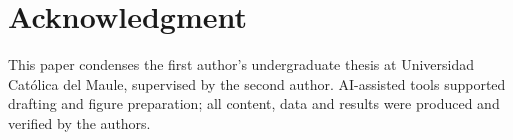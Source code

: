 \documentclass[conference]{IEEEtran}
\begin{document}
\section*{Acknowledgment}
This paper condenses the first author's undergraduate thesis at Universidad Cat\'olica del
Maule, supervised by the second author. AI-assisted tools supported drafting and figure
preparation; all content, data and results were produced and verified by the authors.


\balance


\end{document}
